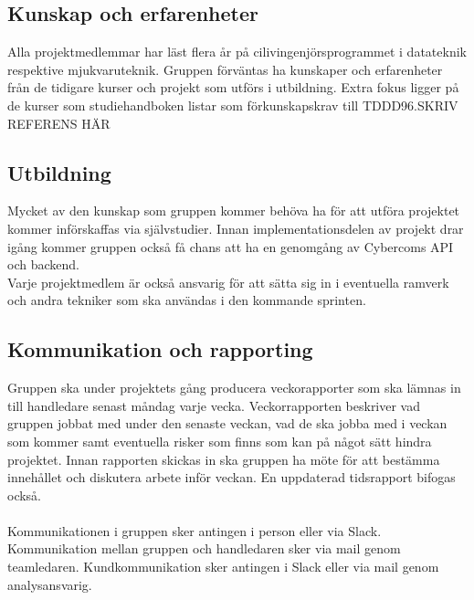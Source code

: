 \subsection{Kunskap och erfarenheter}
Alla projektmedlemmar har läst flera år på cilivingenjörsprogrammet i datateknik respektive mjukvaruteknik. Gruppen förväntas ha kunskaper och erfarenheter från de tidigare kurser och projekt som utförs i utbildning. Extra fokus ligger på de kurser som studiehandboken listar som förkunskapskrav till TDDD96.SKRIV REFERENS HÄR


\subsection{Utbildning}
Mycket av den kunskap som gruppen kommer behöva ha för att utföra projektet kommer införskaffas via självstudier. Innan implementationsdelen av projekt drar igång kommer gruppen också få chans att ha en genomgång av Cybercoms API och backend.
\\
Varje projektmedlem är också ansvarig för att sätta sig in i eventuella ramverk och andra tekniker som ska användas i den kommande sprinten.

\subsection{Kommunikation och rapporting}
Gruppen ska under projektets gång producera veckorapporter som ska lämnas in till handledare senast måndag varje vecka. Veckorrapporten beskriver vad gruppen jobbat med under den senaste veckan, vad de ska jobba med i veckan som kommer samt eventuella risker som finns som kan på något sätt hindra projektet. Innan rapporten skickas in ska gruppen ha möte för att bestämma innehållet och diskutera arbete inför veckan. En uppdaterad tidsrapport bifogas också.\\
\\
Kommunikationen i gruppen sker antingen i person eller via Slack. Kommunikation mellan gruppen och handledaren sker via mail genom teamledaren. Kundkommunikation sker antingen i Slack eller via mail genom analysansvarig.